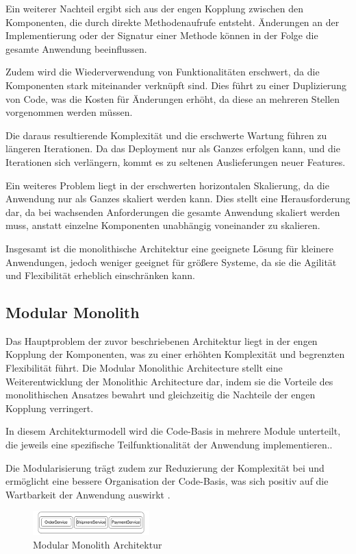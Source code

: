 \documentclass[acmtog]{acmart}
\begin{document}
Ein weiterer Nachteil ergibt sich aus der engen Kopplung zwischen den Komponenten,
die durch direkte Methodenaufrufe entsteht.
Änderungen an der Implementierung oder
der Signatur einer Methode können in der Folge die gesamte Anwendung beeinflussen.

Zudem wird die Wiederverwendung von Funktionalitäten erschwert, da die Komponenten
stark miteinander verknüpft sind.
Dies führt zu einer Duplizierung von Code, was die Kosten für Änderungen erhöht,
da diese an mehreren Stellen vorgenommen werden müssen.

Die daraus resultierende Komplexität und die erschwerte Wartung führen zu längeren
Iterationen.
Da das Deployment nur als Ganzes erfolgen kann, und die Iterationen
sich verlängern, kommt es zu seltenen Auslieferungen neuer Features.

Ein weiteres Problem liegt in der erschwerten horizontalen Skalierung, da die Anwendung
nur als Ganzes skaliert werden kann.
Dies stellt eine Herausforderung dar, da bei wachsenden
Anforderungen die gesamte Anwendung skaliert werden muss, anstatt einzelne Komponenten unabhängig
voneinander zu skalieren.

Insgesamt ist die monolithische Architektur eine geeignete Lösung für
kleinere Anwendungen, jedoch weniger geeignet für größere Systeme, da sie die Agilität und
Flexibilität erheblich einschränken kann.

\subsection{Modular Monolith}
Das Hauptproblem der zuvor beschriebenen Architektur liegt in der engen Kopplung der Komponenten,
was zu einer erhöhten Komplexität und begrenzten Flexibilität führt.
Die Modular Monolithic Architecture stellt eine Weiterentwicklung der Monolithic Architecture dar,
indem sie die Vorteile des monolithischen Ansatzes bewahrt und gleichzeitig die Nachteile
der engen Kopplung verringert.

In diesem Architekturmodell wird die Code-Basis in mehrere Module unterteilt, die jeweils
eine spezifische Teilfunktionalität der Anwendung implementieren.\cite[11]{modular-mono2}.

Die Modularisierung trägt zudem zur Reduzierung der Komplexität bei und ermöglicht eine bessere
Organisation der Code-Basis, was sich positiv auf die Wartbarkeit der Anwendung auswirkt \cite[23 - 24]{modular-mono4}.

\begin{figure}[h!]
    \centering
    \includegraphics[width=0.4\textwidth]{images/mono/mono-example.pdf}
    \caption{Modular Monolith Architektur}
    \label{fig:modular-mono}
\end{figure}
\end{document}
